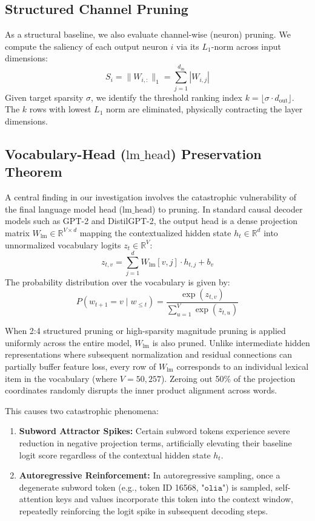 \documentclass[conference]{IEEEtran}
\begin{document}
\subsection{Structured Channel Pruning}
As a structural baseline, we also evaluate channel-wise (neuron) pruning. We compute the saliency of each output neuron $i$ via its $L_1$-norm across input dimensions:
\begin{equation}
S_i = \|W_{i, :}\|_1 = \sum_{j=1}^{d_{\text{in}}} |W_{i, j}|
\end{equation}
Given target sparsity $\sigma$, we identify the threshold ranking index $k = \lfloor \sigma \cdot d_{\text{out}} \rfloor$. The $k$ rows with lowest $L_1$ norm are eliminated, physically contracting the layer dimensions.

\subsection{Vocabulary-Head ($\text{lm\_head}$) Preservation Theorem}
A central finding in our investigation involves the catastrophic vulnerability of the final language model head ($\text{lm\_head}$) to pruning. In standard causal decoder models such as GPT-2 and DistilGPT-2, the output head is a dense projection matrix $W_{\text{lm}} \in \mathbb{R}^{V \times d}$ mapping the contextualized hidden state $h_t \in \mathbb{R}^d$ into unnormalized vocabulary logits $z_t \in \mathbb{R}^V$:
\begin{equation}
z_{t, v} = \sum_{j=1}^d W_{\text{lm}}[v, j] \cdot h_{t, j} + b_v
\end{equation}
The probability distribution over the vocabulary is given by:
\begin{equation}
P(w_{t+1} = v \mid w_{\le t}) = \frac{\exp(z_{t, v})}{\sum_{u=1}^V \exp(z_{t, u})}
\end{equation}

When 2:4 structured pruning or high-sparsity magnitude pruning is applied uniformly across the entire model, $W_{\text{lm}}$ is also pruned. Unlike intermediate hidden representations where subsequent normalization and residual connections can partially buffer feature loss, every row of $W_{\text{lm}}$ corresponds to an individual lexical item in the vocabulary (where $V = 50,257$). Zeroing out 50\% of the projection coordinates randomly disrupts the inner product alignment across words. 

This causes two catastrophic phenomena:
\begin{enumerate}
    \item \textbf{Subword Attractor Spikes:} Certain subword tokens experience severe reduction in negative projection terms, artificially elevating their baseline logit score regardless of the contextual hidden state $h_t$.
    \item \textbf{Autoregressive Reinforcement:} In autoregressive sampling, once a degenerate subword token (e.g., token ID 16568, $\texttt{"olia"}$) is sampled, self-attention keys and values incorporate this token into the context window, repeatedly reinforcing the logit spike in subsequent decoding steps.
\end{enumerate}
\end{document}
